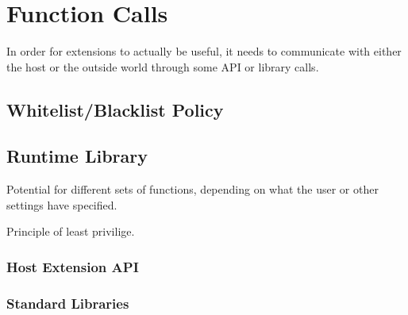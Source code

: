 \chapter {Function Calls}

In order for extensions to actually be useful, it needs to communicate with
either the host or the outside world through some API or library calls.


\section {Whitelist/Blacklist Policy}


\section {Runtime Library}

Potential for different sets of functions, depending on what the user or other
settings have specified.

Principle of least privilige.

\subsection {Host Extension API}

\subsection {Standard Libraries}

